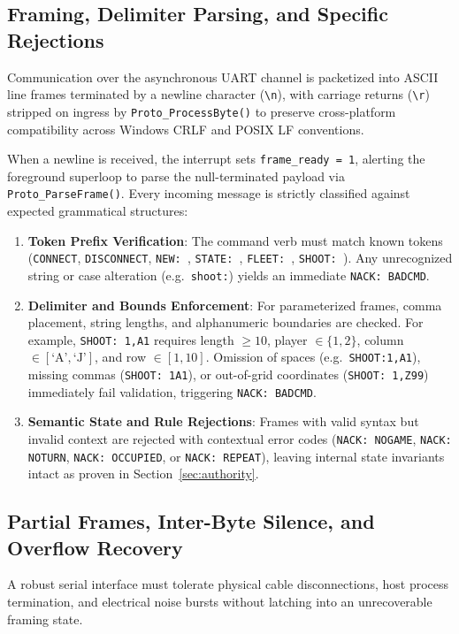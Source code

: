 \subsection{Framing, Delimiter Parsing, and Specific Rejections}
Communication over the asynchronous UART channel is packetized into ASCII line frames terminated by a newline character (\texttt{\textbackslash n}), with carriage returns (\texttt{\textbackslash r}) stripped on ingress by \texttt{Proto\_ProcessByte()} to preserve cross-platform compatibility across Windows CRLF and POSIX LF conventions. 

When a newline is received, the interrupt sets \texttt{frame\_ready = 1}, alerting the foreground superloop to parse the null-terminated payload via \texttt{Proto\_ParseFrame()}. Every incoming message is strictly classified against expected grammatical structures:
\begin{enumerate}
    \item \textbf{Token Prefix Verification}: The command verb must match known tokens (\texttt{CONNECT}, \texttt{DISCONNECT}, \texttt{NEW: }, \texttt{STATE: }, \texttt{FLEET: }, \texttt{SHOOT: }). Any unrecognized string or case alteration (e.g.\ \texttt{shoot:}) yields an immediate \texttt{NACK: BADCMD}.
    \item \textbf{Delimiter and Bounds Enforcement}: For parameterized frames, comma placement, string lengths, and alphanumeric boundaries are checked. For example, \texttt{SHOOT: 1,A1} requires length $\ge 10$, player $\in \{1, 2\}$, column $\in [\text{`A'}, \text{`J'}]$, and row $\in [1, 10]$. Omission of spaces (e.g.\ \texttt{SHOOT:1,A1}), missing commas (\texttt{SHOOT: 1A1}), or out-of-grid coordinates (\texttt{SHOOT: 1,Z99}) immediately fail validation, triggering \texttt{NACK: BADCMD}.
    \item \textbf{Semantic State and Rule Rejections}: Frames with valid syntax but invalid context are rejected with contextual error codes (\texttt{NACK: NOGAME}, \texttt{NACK: NOTURN}, \texttt{NACK: OCCUPIED}, or \texttt{NACK: REPEAT}), leaving internal state invariants intact as proven in Section~\ref{sec:authority}.
\end{enumerate}

\subsection{Partial Frames, Inter-Byte Silence, and Overflow Recovery}
A robust serial interface must tolerate physical cable disconnections, host process termination, and electrical noise bursts without latching into an unrecoverable framing state.

